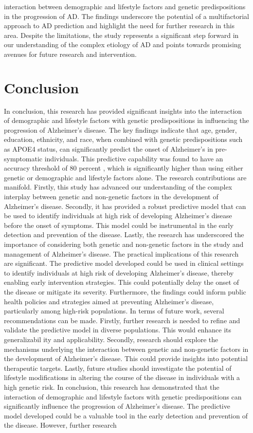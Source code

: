 \documentclass[conference]{IEEEtran}
\begin{document}
interaction between demographic and lifestyle factors and genetic predispositions in the progression of AD. The findings underscore the potential of a multifactorial approach to AD prediction and highlight the need for further research in this area. Despite the limitations, the study represents a significant step forward in our understanding of the complex etiology of AD and points towards promising avenues for future research and intervention.

\section{Conclusion}
In conclusion, this research has provided significant insights into the interaction of demographic and lifestyle factors with genetic predispositions in influencing the progression of Alzheimer's disease. The key findings indicate that age, gender, education, ethnicity, and race, when combined with genetic predispositions such as APOE4 status, can significantly predict the onset of Alzheimer's in pre-symptomatic individuals. This predictive capability was found to have an accuracy threshold of 80 percent , which is significantly higher than using either genetic or demographic and lifestyle factors alone. The research contributions are manifold. Firstly, this study has advanced our understanding of the complex interplay between genetic and non-genetic factors in the development of Alzheimer's disease. Secondly, it has provided a robust predictive model that can be used to identify individuals at high risk of developing Alzheimer's disease before the onset of symptoms. This model could be instrumental in the early detection and prevention of the disease. Lastly, the research has underscored the importance of considering both genetic and non-genetic factors in the study and management of Alzheimer's disease. The practical implications of this research are significant. The predictive model developed could be used in clinical settings to identify individuals at high risk of developing Alzheimer's disease, thereby enabling early intervention strategies. This could potentially delay the onset of the disease or mitigate its severity. Furthermore, the findings could inform public health policies and strategies aimed at preventing Alzheimer's disease, particularly among high-risk populations. In terms of future work, several recommendations can be made. Firstly, further research is needed to refine and validate the predictive model in diverse populations. This would enhance its generalizabil ity and applicability. Secondly, research should explore the mechanisms underlying the interaction between genetic and non-genetic factors in the development of Alzheimer's disease. This could provide insights into potential therapeutic targets. Lastly, future studies should investigate the potential of lifestyle modifications in altering the course of the disease in individuals with a high genetic risk. In conclusion, this research has demonstrated that the interaction of demographic and lifestyle factors with genetic predispositions can significantly influence the progression of Alzheimer's disease. The predictive model developed could be a valuable tool in the early detection and prevention of the disease. However, further research 
\end{document}
